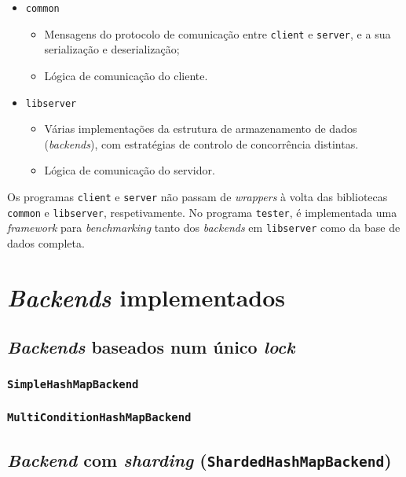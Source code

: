 \documentclass[11pt, a4paper]{article}
\begin{document}
\begin{itemize}
    \item \texttt{common}
    \begin{itemize}
        \item Mensagens do protocolo de comunicação entre \texttt{client} e \texttt{server}, e a sua
            serialização e deserialização;

        \item Lógica de comunicação do cliente.
    \end{itemize}

    \item \texttt{libserver}
    \begin{itemize}
        \item Várias implementações da estrutura de armazenamento de dados (\emph{backends}), com
            estratégias de controlo de concorrência distintas.

        \item Lógica de comunicação do servidor.
    \end{itemize}
\end{itemize}

Os programas \texttt{client} e \texttt{server} não passam de \emph{wrappers} à volta das bibliotecas
\texttt{common} e \texttt{libserver}, respetivamente. No programa \texttt{tester}, é implementada
uma \emph{framework} para \emph{benchmarking} tanto dos \emph{backends} em \texttt{libserver} como
da base de dados completa.

\section{\emph{Backends} implementados}

\subsection{\emph{Backends} baseados num único \emph{lock}}

\subsubsection{\texttt{SimpleHashMapBackend}}

\subsubsection{\texttt{MultiConditionHashMapBackend}}

\subsection{\emph{Backend} com \emph{sharding} (\texttt{ShardedHashMapBackend})}
\end{document}
